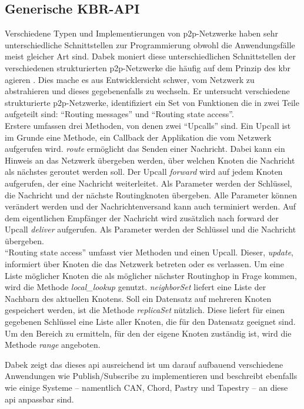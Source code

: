 \subsection{Generische KBR-API}
\label{chap:grundlagen:api}
Verschiedene Typen und Implementierungen von p2p-Netzwerke haben sehr unterschiedliche Schnittstellen zur Programmierung obwohl die Anwendungsfälle meist gleicher Art sind. Dabek moniert diese unterschiedlichen Schnittstellen der verschiedenen strukturierten p2p-Netzwerke die häufig auf dem Prinzip des \ac{kbr} agieren \cite{Dabek2003Towards}. Dies mache es aus Entwicklersicht schwer, vom Netzwerk zu abstrahieren und dieses gegebenenfalls zu wechseln. Er untersucht verschiedene strukturierte p2p-Netzwerke, identifiziert ein Set von Funktionen die in zwei Teile aufgeteilt sind: \enquote{Routing messages} und \enquote{Routing state access}.\\
Erstere umfassen drei Methoden, von denen zwei \enquote{Upcalls} sind. Ein Upcall ist im Grunde eine Methode, ein Callback der Applikation die vom Netzwerk aufgerufen wird. \emph{route} ermöglicht das Senden einer Nachricht. Dabei kann ein Hinweis an das Netzwerk übergeben werden, über welchen Knoten die Nachricht als nächstes geroutet werden soll. Der Upcall \emph{forward} wird auf jedem Knoten aufgerufen, der eine Nachricht weiterleitet. Als Parameter werden der Schlüssel, die Nachricht und der nächste Routingknoten übergeben. Alle Parameter können verändert werden und der Nachrichtenversand kann auch terminiert werden. Auf dem eigentlichen Empfänger der Nachricht wird zusätzlich nach forward der Upcall \emph{deliver} aufgerufen. Als Parameter werden der Schlüssel und die Nachricht übergeben.\\
\enquote{Routing state access} umfasst vier Methoden und einen Upcall. Dieser, \emph{update}, informiert über Knoten die das Netzwerk betreten oder es verlassen. Um eine Liste möglicher Knoten die als möglicher nächster Routinghop in Frage kommen, wird die Methode \emph{local\_lookup} genutzt. \emph{neighborSet} liefert eine Liste der Nachbarn des aktuellen Knotens. Soll ein Datensatz auf mehreren Knoten gespeichert werden, ist die Methode \emph{replicaSet} nützlich. Diese liefert für einen gegebenen Schlüssel eine Liste aller Knoten, die für den Datensatz geeignet sind. Um den Bereich zu ermitteln, für den der eigene Knoten zuständig ist, wird die Methode \emph{range} angeboten.

Dabek zeigt das dieses \acf{api} ausreichend ist um darauf aufbauend verschiedene Anwendungen wie Publish/Subscribe zu implementieren und beschreibt ebenfalls wie einige Systeme -- namentlich CAN, Chord, Pastry und Tapestry -- an diese \ac{api} anpassbar sind.
